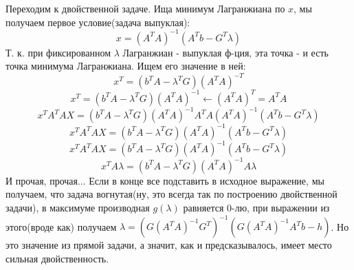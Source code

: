 \documentclass{article}
\begin{document}
Переходим к двойственной задаче. Ища минимум Лагранжиана по $x$, мы получаем первое условие(задача выпуклая):
$$ x = (A^TA)^{-1}(A^Tb - G^T\lambda)$$
Т. к. при фиксированном $\lambda$ Лагранжиан - выпуклая ф-ция, эта точка - и есть точка минимума 
Лагранжиана. Ищем его значение в ней: 
$$x^T = (b^TA - \lambda^TG)(A^TA)^{-T} $$
$$x^T = (b^TA - \lambda^TG)(A^TA)^{-1} \longleftarrow (A^TA)^T = A^TA$$
$$x^TA^TAX = (b^TA - \lambda^TG)(A^TA)^{-1} A^TA (A^TA)^{-1}(A^Tb - G^T\lambda) $$
$$x^TA^TAX = (b^TA - \lambda^TG)(A^TA)^{-1} (A^Tb - G^T\lambda) $$
$$x^TA^TAX = (b^TA - \lambda^TG)(A^TA)^{-1} (A^Tb - G^T\lambda) $$ 
$$ x^TA\lambda = (b^TA - \lambda^TG)(A^TA)^{-1} A \lambda$$
И прочая, прочая... Если в конце все подставить в исходное выражение, мы получаем, что задача вогнутая(ну, это всегда так по построению двойственной задачи), в максимуме производная $g(\lambda)$ равняется 0-лю, при выражении из этого(вроде как) получаем $\lambda = (G(A^TA)^{-1}G^T)^{-1}(G(A^TA)^{-1}A^Tb - h)$. Но это значение из прямой задачи, а значит, как и предсказывалось, имеет место сильная двойственность.
\end{document}
